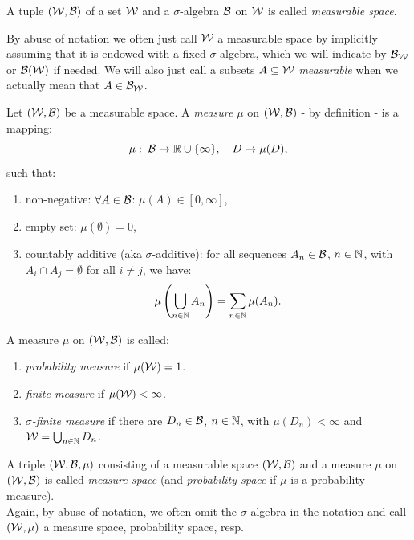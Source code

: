 \begin{Def}
    \label{def-measurable-space}
    A tuple $(\mathcal{W},\mathcal{B})$ of a set $\mathcal{W}$ and a $\sigma$-algebra $\mathcal{B}$ on $\mathcal{W}$ is called \emph{measurable space}.
\end{Def}

\begin{Rem}
 By abuse of notation we often just call $\mathcal{W}$ a measurable space by implicitly assuming that it is endowed with a fixed $\sigma$-algebra, which we will indicate by $\mathcal{B}_{\mathcal{W}}$ or $\mathcal{B}(\mathcal{W})$ if needed. We will also just call a subsets $A \subseteq \mathcal{W}$ \emph{measurable} when we actually mean that $A \in \mathcal{B}_{\mathcal{W}}$.
\end{Rem}

\begin{Def}[Measures]
    \label{def-measure}
    Let $(\mathcal{W},\mathcal{B})$ be a measurable space.
    A \emph{measure} $\mu$ on $(\mathcal{W},\mathcal{B})$ - by definition - is a mapping:
    \[\mu: \; \mathcal{B} \to \mathbb{R} \cup \{\infty\},\quad D \mapsto \mu(D), \]
    such that:
    \begin{enumerate}[label=\roman*)]
        \item non-negative: $\forall A \in \mathcal{B}$: $\mu(A) \in [0,\infty]$,
        \item empty set: $\mu(\emptyset) =0$,
        \item countably additive (aka $\sigma$-additive): for all sequences $A_n \in \mathcal{B}$, $n \in \mathbb{N}$, with $A_i \cap A_j = \emptyset$ for all $i \neq j$, we have:
    \[\mu\left (\bigcup_{n \in \mathbb{N}} A_n\right ) = \sum_{n \in \mathbb{N}} \mu(A_n).\]
    \end{enumerate}
    \end{Def}

\begin{Def}
    A measure $\mu$ on $(\mathcal{W},\mathcal{B})$ is called:
    \begin{enumerate}
        \item \emph{probability measure} if $\mu(\mathcal{W})=1$.
        \item \emph{finite measure} if $\mu(\mathcal{W}) < \infty$.
        \item \emph{$\sigma$-finite measure} if there are $D_n \in \mathcal{B}$, $n \in \mathbb{N}$, with $\mu(D_n) < \infty$ and $\mathcal{W} = \bigcup_{n \in \mathbb{N}} D_n$.
    \end{enumerate}
\end{Def}

\begin{Def}
    A triple $(\mathcal{W}, \mathcal{B}, \mu)$ consisting of a measurable space $(\mathcal{W},\mathcal{B})$ and a measure $\mu$ on $(\mathcal{W},\mathcal{B})$ is called \emph{measure space}
    (and \emph{probability space} if $\mu$ is a probability measure).\\
    Again, by abuse of notation, we often omit the $\sigma$-algebra in the notation and call $(\mathcal{W},\mu)$ a measure space, probability space, resp.
\end{Def}

